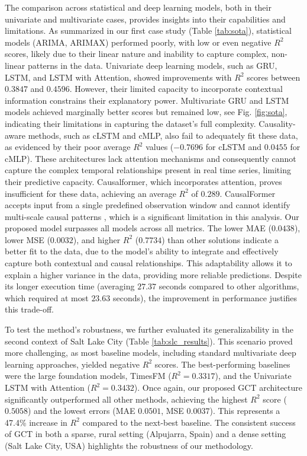 \documentclass[acmsmall]{acmart}
\begin{document}
The comparison across statistical and deep learning models, both in their univariate and multivariate cases, provides insights into their capabilities and limitations. As summarized in {\color{black} our first case study} (Table \ref{tab:sota}), statistical models (ARIMA, ARIMAX) performed poorly, with low or even negative $R^2$ scores, likely due to their linear nature and inability to capture complex, non-linear patterns in the data. Univariate deep learning models, such as GRU, LSTM, and LSTM with Attention, showed improvements with $R^2$ scores between $0.3847$ and $0.4596$. However, their limited capacity to incorporate contextual information constrains their explanatory power. Multivariate GRU and LSTM models achieved marginally better scores but remained low, see Fig. \ref{fig:sota}, indicating their limitations in capturing the dataset's full complexity. Causality-aware methods, such as cLSTM and cMLP, also fail to adequately fit these data, as evidenced by their poor average $R^2$ values ($-0.7696$ for cLSTM and $0.0455$ for cMLP). These architectures lack attention mechanisms and consequently cannot capture the complex temporal relationships present in real time series, limiting their predictive capacity. Causalformer, which incorporates attention, proves insufficient for these data, achieving an average $R^2$ of $0.289$. CausalFormer accepts input from a single predefined observation window and cannot identify multi-scale causal patterns \cite{kong2024causalformer}, which is a significant limitation in this analysis. Our proposed model surpasses all models across all metrics. The lower MAE ($0.0438$), lower MSE ($0.0032$), and higher $R^2$ ($0.7734$) than other solutions indicate a better fit to the data, due to the model's ability to integrate and effectively capture both contextual and causal relationships. This adaptability allows it to explain a higher variance in the data, providing more reliable predictions. Despite its longer execution time (averaging $27.37$ seconds compared to other algorithms, which required at most $23.63$ seconds), the improvement in performance justifies this trade-off.

{\color{black} To test the method's robustness, we further evaluated its generalizability in the second context of Salt Lake City (Table \ref{tab:slc_results}). This scenario proved more challenging, as most baseline models, including standard multivariate deep learning approaches, yielded negative $R^2$ scores. The best-performing baselines were the large foundation models, TimesFM ($R^2=0.3317$), and the Univariate LSTM with Attention ($R^2=0.3432$). Once again, our proposed GCT {\color{blue}architecture} significantly outperformed all other methods, achieving the highest $R^2$ score ($0.5058$) and the lowest errors (MAE $0.0501$, MSE $0.0037$). This represents a 47.4\% increase in $R^2$ compared to the next-best baseline. The consistent success of GCT in both a sparse, rural setting (Alpujarra, Spain) and a dense setting (Salt Lake City, USA) highlights the robustness of our methodology.}
\end{document}
